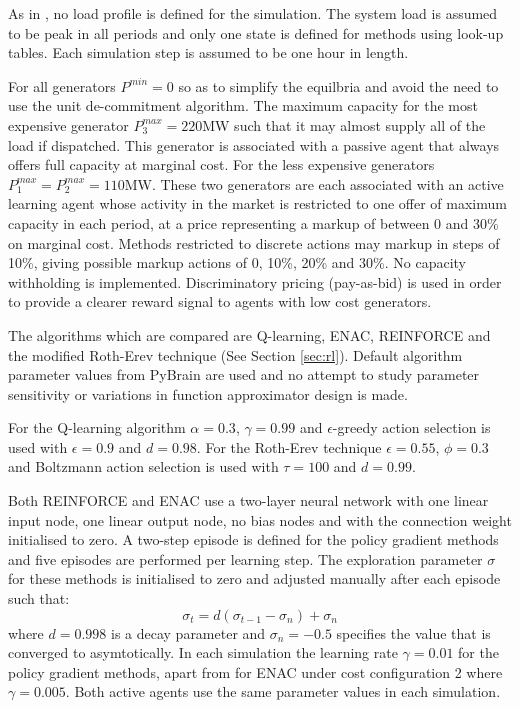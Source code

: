 As in , no load profile is defined for the simulation. The
system load is assumed to be peak in all periods and only one state is defined
for methods using look-up tables.  Each simulation step is assumed to be one
hour in length.

For all generators $P^{min}=0$ so as to simplify the equilbria and avoid the
need to use the unit de-commitment algorithm.  The maximum capacity for the most
expensive generator $P^{max}_3=220$MW such that it may almost supply all of the
load if dispatched.  This generator is associated with a passive agent that
always offers full capacity at marginal cost.  For the less expensive generators
$P^{max}_1=P^{max}_2=110$MW.  These two generators are each associated with an
active learning agent whose activity in the market is restricted to one offer of
maximum capacity in each period, at a price representing a markup of between 0
and 30\% on marginal cost.  Methods restricted to discrete actions may markup in
steps of 10\%, giving possible markup actions of 0, 10\%, 20\% and 30\%.  No
capacity withholding is implemented.
Discriminatory pricing (pay-as-bid) is used in order to provide a clearer reward
signal to agents with low cost generators.

The algorithms which are compared are Q-learning, ENAC, REINFORCE and the
modified Roth-Erev technique (See Section \ref{sec:rl}). Default algorithm
parameter values from PyBrain are used and no attempt to study parameter sensitivity or variations in function approximator
design is made.

For the Q-learning algorithm $\alpha=0.3$, $\gamma=0.99$ and $\epsilon$-greedy
action selection is used with $\epsilon=0.9$ and $d=0.98$.  For the Roth-Erev
technique $\epsilon=0.55$, $\phi=0.3$ and Boltzmann action selection is used
with $\tau=100$ and $d=0.99$.

Both REINFORCE and ENAC use a two-layer neural network with one linear input
node, one linear output node, no bias nodes and with the connection weight
initialised to zero.  A two-step episode is defined for the policy gradient
methods and five episodes are performed per learning step.  The exploration
parameter $\sigma$ for these methods is initialised to zero and adjusted
manually after each episode such that:
\begin{equation}
\label{eq:sigmadecay}
\sigma_{t} = d(\sigma_{t-1}-\sigma_{n})+\sigma_{n}
\end{equation}
where $d=0.998$ is a decay parameter and $\sigma_{n}=-0.5$ specifies the
value that is converged to asymtotically.  In each simulation the learning rate
$\gamma=0.01$ for the policy gradient methods, apart from for ENAC under cost
configuration 2 where $\gamma=0.005$.  Both active agents use the same
parameter values in each simulation.

